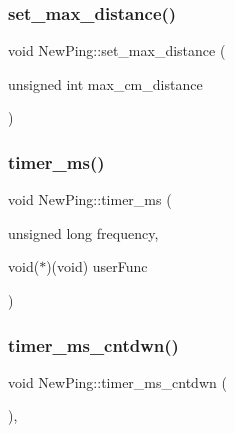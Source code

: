 \subsubsection{\texorpdfstring{set\+\_\+max\+\_\+distance()}{set\_max\_distance()}}
{\footnotesize\ttfamily void New\+Ping\+::set\+\_\+max\+\_\+distance (\begin{DoxyParamCaption}\item[{unsigned int}]{max\+\_\+cm\+\_\+distance }\end{DoxyParamCaption})\hspace{0.3cm}{\ttfamily [private]}}

\mbox{\label{class_new_ping_a2552285b019633be9069d030d5417e73}} 
\subsubsection{\texorpdfstring{timer\+\_\+ms()}{timer\_ms()}}
{\footnotesize\ttfamily void New\+Ping\+::timer\+\_\+ms (\begin{DoxyParamCaption}\item[{unsigned long}]{frequency,  }\item[{void($\ast$)(void)}]{user\+Func }\end{DoxyParamCaption})\hspace{0.3cm}{\ttfamily [static]}}

\mbox{\label{class_new_ping_a28f65f8a4496bbb91048d8714dfac86e}} 
\subsubsection{\texorpdfstring{timer\+\_\+ms\+\_\+cntdwn()}{timer\_ms\_cntdwn()}}
{\footnotesize\ttfamily void New\+Ping\+::timer\+\_\+ms\+\_\+cntdwn (\begin{DoxyParamCaption}{ }\end{DoxyParamCaption})\hspace{0.3cm}{\ttfamily [static]}, {\ttfamily [private]}}

\mbox{\label{class_new_ping_a8cfefcf91475e546f3c12efb9a90d1ca}} 
